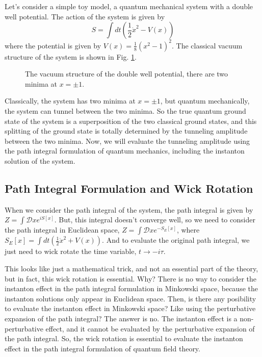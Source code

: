 \documentclass{article}
\begin{document}
Let's consider a simple toy model, a quantum mechanical system with a double well potential. The action of the system is given by
\begin{equation}
    S = \int dt \left( \frac{1}{2} \dot{x}^2 - V(x) \right)
\end{equation}
where the potential is given by $V(x) = \frac{1}{8}(x^2-1)^2$.
The classical vacuum structure of the system is shown in Fig. \ref{fig:doublewell}.
\begin{figure}[h]
    \centering
    \caption{The vacuum structure of the double well potential, there are two minima at $x = \pm 1$.}
    \label{fig:doublewell}
\end{figure}

Classically, the system has two minima at $x = \pm 1$, but quantum mechanically, the system can tunnel between the two minima.
So the true quantum ground state of the system is a superposition of the two classical ground states, and this splitting of the ground state is totally determined by the tunneling amplitude between the two minima.
Now, we will evaluate the tunneling amplitude using the path integral formulation of quantum mechanics, including the instanton solution of the system. 




\subsection{Path Integral Formulation and Wick Rotation}


When we consider the path integral of the system, the path integral is given by $Z = \int \mathcal{D}x e^{iS[x]}$.
But, this integral doesn't converge well, so we need to consider the path integral in Euclidean space, $Z = \int \mathcal{D}x e^{-S_E[x]}$, where $S_E[x] = \int dt \left( \frac{1}{2} \dot{x}^2 + V(x) \right)$.
And to evaluate the original path integral, we just need to wick rotate the time variable, $t \rightarrow -i\tau$.

This looks like just a mathematical trick, and not an essential part of the theory, but in fact, this wick rotation is essential.
Why? There is no way to consider the instanton effect in the path integral formulation in Minkowski space, because the instanton solutions only appear in Euclidean space.
Then, is there any posibility to evaluate the instanton effect in Minkowski space? Like using the perturbative expansion of the path integral? The answer is no. The instanton effect is a non-perturbative effect, and it cannot be evaluated by the perturbative expansion of the path integral.
So, the wick rotation is essential to evaluate the instanton effect in the path integral formulation of quantum field theory.
\end{document}
